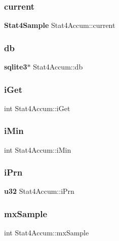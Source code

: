\mbox{\label{struct_stat4_accum_a9e65f562b6944448edde933a6d29fdf2}} 
\subsubsection{current}
{\footnotesize\ttfamily \textbf{ Stat4\+Sample} Stat4\+Accum\+::current}

\mbox{\label{struct_stat4_accum_af0ae3ddd7a24a925ebe090db6f06a12b}} 
\subsubsection{db}
{\footnotesize\ttfamily \textbf{ sqlite3}$\ast$ Stat4\+Accum\+::db}

\mbox{\label{struct_stat4_accum_aee70ce1c45daa00581265d27337bce5e}} 
\subsubsection{iGet}
{\footnotesize\ttfamily int Stat4\+Accum\+::i\+Get}

\mbox{\label{struct_stat4_accum_a9935fae376aa4010a0d205e7a3283d36}} 
\subsubsection{iMin}
{\footnotesize\ttfamily int Stat4\+Accum\+::i\+Min}

\mbox{\label{struct_stat4_accum_a13746aceec404f569af80ee44c9315ac}} 
\subsubsection{iPrn}
{\footnotesize\ttfamily \textbf{ u32} Stat4\+Accum\+::i\+Prn}

\mbox{\label{struct_stat4_accum_a2133206dd5209b1b0fce485bc6d48043}} 
\subsubsection{mxSample}
{\footnotesize\ttfamily int Stat4\+Accum\+::mx\+Sample}

